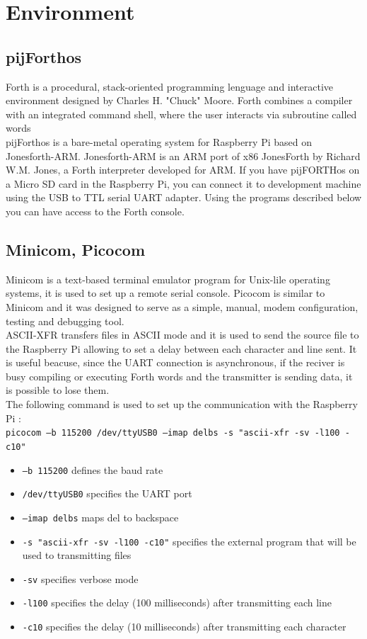 \documentclass[]{article}
\begin{document}
\section{Environment}

\subsection{pijForthos}
Forth is a procedural, stack-oriented programming lenguage and interactive environment designed by Charles H. "Chuck" Moore. Forth combines
a compiler with an integrated command shell, where the user interacts via subroutine called words \\
pijForthos is a bare-metal operating system for Raspberry Pi based on Jonesforth-ARM. Jonesforth-ARM is an ARM port of x86 JonesForth 
by Richard W.M. Jones, a Forth interpreter developed for ARM. If you have pijFORTHos on a Micro SD card in the Raspberry Pi, you can connect
it to development machine using the USB to TTL serial UART adapter. Using the programs described below you can have access to 
the Forth console.


\subsection{Minicom, Picocom}
Minicom is a text-based terminal emulator program for Unix-lile operating systems, it is used to set up a remote serial console.
Picocom is similar to Minicom and it was designed to serve as a simple, manual, modem configuration, testing and debugging tool. \\
ASCII-XFR transfers files in ASCII mode and it is used to send the source file to the Raspberry Pi allowing to set a delay between each character and line sent. It is useful
beacuse, since the UART connection is asynchronous, if the reciver is busy compiling or executing Forth words and the transmitter is sending data,
it is possible to lose them.  \\
The following command is used to set up the communication with the Raspberry Pi : \\
\texttt{picocom --b 115200 /dev/ttyUSB0 --imap delbs -s "ascii-xfr -sv -l100 -c10"}

\begin{itemize}
    \item \texttt{--b 115200} defines the baud rate
    \item \texttt{/dev/ttyUSB0} specifies the UART port
    \item \texttt{--imap delbs} maps del to backspace
    \item \texttt{-s "ascii-xfr -sv -l100 -c10"} specifies the external program that will be used to transmitting files
    \item \texttt{-sv} specifies verbose mode 
    \item \texttt{-l100} specifies the delay (100 milliseconds) after transmitting each line
    \item \texttt{-c10} specifies the delay (10 milliseconds) after transmitting each character
\end{itemize}
\end{document}
